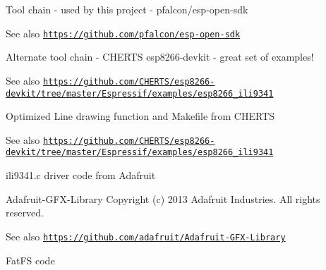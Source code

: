  \begin{DoxyParagraph}{Tool chain -\/ used by this project -\/ pfalcon/esp-\/open-\/sdk }

\end{DoxyParagraph}
\begin{DoxySeeAlso}{See also}
\href{https://github.com/pfalcon/esp-open-sdk}{\tt https\+://github.\+com/pfalcon/esp-\/open-\/sdk} 

 
\end{DoxySeeAlso}
\begin{DoxyParagraph}{Alternate tool chain -\/ C\+H\+E\+R\+TS esp8266-\/devkit -\/ great set of examples!}

\end{DoxyParagraph}
\begin{DoxySeeAlso}{See also}
\href{https://github.com/CHERTS/esp8266-devkit/tree/master/Espressif/examples/esp8266_ili9341}{\tt https\+://github.\+com/\+C\+H\+E\+R\+T\+S/esp8266-\/devkit/tree/master/\+Espressif/examples/esp8266\+\_\+ili9341} 

 
\end{DoxySeeAlso}
\begin{DoxyParagraph}{Optimized Line drawing function and Makefile from C\+H\+E\+R\+TS}

\end{DoxyParagraph}
\begin{DoxySeeAlso}{See also}
\href{https://github.com/CHERTS/esp8266-devkit/tree/master/Espressif/examples/esp8266_ili9341}{\tt https\+://github.\+com/\+C\+H\+E\+R\+T\+S/esp8266-\/devkit/tree/master/\+Espressif/examples/esp8266\+\_\+ili9341} 

 
\end{DoxySeeAlso}
\begin{DoxyParagraph}{ili9341.c driver code from Adafruit}

\end{DoxyParagraph}
\begin{DoxyParagraph}{Adafruit-\/\+G\+F\+X-\/\+Library Copyright (c) 2013 Adafruit Industries. }
All rights reserved. 
\end{DoxyParagraph}
\begin{DoxySeeAlso}{See also}
\href{https://github.com/adafruit/Adafruit-GFX-Library}{\tt https\+://github.\+com/adafruit/\+Adafruit-\/\+G\+F\+X-\/\+Library} 

 
\end{DoxySeeAlso}
\begin{DoxyParagraph}{Fat\+FS code}

\end{DoxyParagraph}
